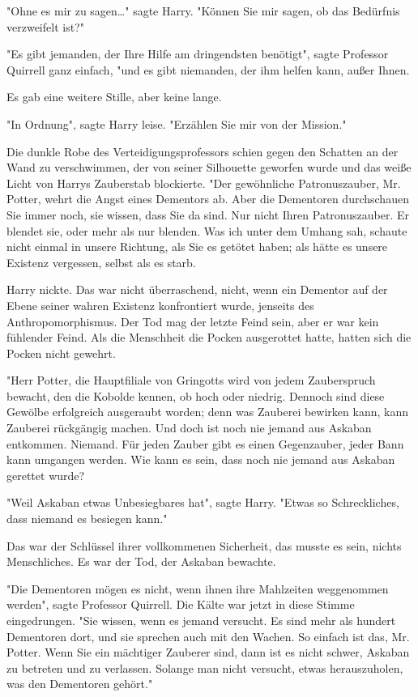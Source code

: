 {"Ohne es mir zu sagen…" sagte Harry. "Können Sie mir sagen, ob das Bedürfnis verzweifelt ist?"

"Es gibt jemanden, der Ihre Hilfe am dringendsten benötigt", sagte Professor Quirrell ganz einfach, "und es gibt niemanden, der ihm helfen kann, außer Ihnen.

Es gab eine weitere Stille, aber keine lange.

"In Ordnung", sagte Harry leise. "Erzählen Sie mir von der Mission."

Die dunkle Robe des Verteidigungsprofessors schien gegen den Schatten an der Wand zu verschwimmen, der von seiner Silhouette geworfen wurde und das weiße Licht von Harrys Zauberstab blockierte. "Der gewöhnliche Patronuszauber, Mr. Potter, wehrt die Angst eines Dementors ab. Aber die Dementoren durchschauen Sie immer noch, sie wissen, dass Sie da sind. Nur nicht Ihren Patronuszauber. Er blendet sie, oder mehr als nur blenden. Was ich unter dem Umhang sah, schaute nicht einmal in unsere Richtung, als Sie es getötet haben; als hätte es unsere Existenz vergessen, selbst als es starb.

Harry nickte. Das war nicht überraschend, nicht, wenn ein Dementor auf der Ebene seiner wahren Existenz konfrontiert wurde, jenseits des Anthropomorphismus. Der Tod mag der letzte Feind sein, aber er war kein fühlender Feind. Als die Menschheit die Pocken ausgerottet hatte, hatten sich die Pocken nicht gewehrt.

"Herr Potter, die Hauptfiliale von Gringotts wird von jedem Zauberspruch bewacht, den die Kobolde kennen, ob hoch oder niedrig. Dennoch sind diese Gewölbe erfolgreich ausgeraubt worden; denn was Zauberei bewirken kann, kann Zauberei rückgängig machen. Und doch ist noch nie jemand aus Askaban entkommen. Niemand. Für jeden Zauber gibt es einen Gegenzauber, jeder Bann kann umgangen werden. Wie kann es sein, dass noch nie jemand aus Askaban gerettet wurde?

"Weil Askaban etwas Unbesiegbares hat", sagte Harry. "Etwas so Schreckliches, dass niemand es besiegen kann."

Das war der Schlüssel ihrer vollkommenen Sicherheit, das musste es sein, nichts Menschliches. Es war der Tod, der Askaban bewachte.

"Die Dementoren mögen es nicht, wenn ihnen ihre Mahlzeiten weggenommen werden", sagte Professor Quirrell. Die Kälte war jetzt in diese Stimme eingedrungen. "Sie wissen, wenn es jemand versucht. Es sind mehr als hundert Dementoren dort, und sie sprechen auch mit den Wachen. So einfach ist das, Mr. Potter. Wenn Sie ein mächtiger Zauberer sind, dann ist es nicht schwer, Askaban zu betreten und zu verlassen. Solange man nicht versucht, etwas herauszuholen, was den Dementoren gehört."

}
